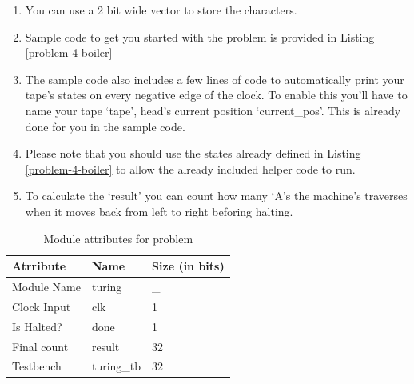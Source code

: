 \documentclass[a4paper,10pt]{article}
\theoremstyle{mytheor}
\newcommand{
  \insertverilog}[3]{
  
}
\newcounter{problemNumber}
\newcounter{hintCount} %
\newcommand{\hintcounter}[1]{%
  \refstepcounter{hintCount}%
  \thehintCount%
  \label{#1}}%
\newcounter{hintcnt}
\newcommand{\hint}[2] {
  \begin{tcolorbox}[arc=1pt,colback=blue!5!white,colframe=blue!75!black,title=\textbf{Hint - \hintcounter{#1}}]  
    #2
  \end{tcolorbox}
  \addtocounter{hintcnt}{1}
}
\begin{document}
{  \hint{hint:problem-3}{ 
    \begin{enumerate}
    \item You can use a 2 bit wide vector to store the characters.
    \item Sample code to get you started with the problem is provided
      in Listing \ref{problem-4-boiler}
    \item The sample code also includes a few lines of code to
      automatically print your tape's states on every negative edge of
      the clock. To enable this you'll have to name your tape `tape',
      head's current position `current\_pos'. This is already done for 
      you in the sample code.
    \item Please note that you should use the states already defined
      in Listing \ref{problem-4-boiler} to allow the already included
      helper code to run.
    \item To calculate the `result' you can count how many `A's the 
      machine's traverses when it moves back from left to right
      beforing halting.
    \end{enumerate}
  }

  \begin{table}[!h]
    \centering
    \caption{Module attributes for problem \theproblemNumber}
    \label{table:problem-3-attr}
    \renewcommand{\arraystretch}{1.1} 
    \begin{tabularx}{0.8\textwidth}{|X|X|X|}
      \hline
      \rowcolor{greatblue}
      \color{white} Atrribute & \color{white}Name & \color{white}Size (in bits) \\
      \hline
      Module Name  & turing          & \_  \\
      Clock Input  & clk             &  1  \\
      Is Halted?   & done            &  1  \\
      Final count  & result          & 32  \\
      Testbench    & turing\_tb      & 32  \\
      \hline
    \end{tabularx}
  \end{table}
  
  \insertverilog{./verilog_files/problem4Boiler.v}{problem-4-boiler}{Code
    to get you started with problem 4.}
}
\end{document}
